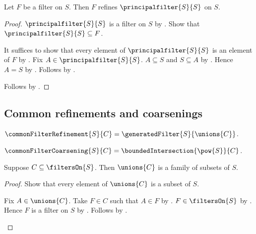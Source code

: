\begin{proposition}\label{every_filter_refines_carrier_principal_filter}
    Let $F$ be a filter on $S$.
    Then $F$ refines $\principalfilter{S}{S}$ on $S$.
\end{proposition}
\begin{proof}
    $\principalfilter{S}{S}$ is a filter on $S$ by
        .
    Show that $\principalfilter{S}{S}\subseteq F$.
    \begin{subproof}
        It suffices to show that every element of
            $\principalfilter{S}{S}$ is an element of $F$ by
            .
        Fix $A\in\principalfilter{S}{S}$.
        $A\subseteq S$ and $S\subseteq A$ by
            .
        Hence $A=S$ by .
        Follows by .
    \end{subproof}
    Follows by .
\end{proof}

\subsection{Common refinements and coarsenings}

\begin{definition}\label{common_filter_refinement}
    $\commonFilterRefinement{S}{C}
        =\generatedFilter{S}{\unions{C}}$.
\end{definition}

\begin{definition}\label{common_filter_coarsening}
    $\commonFilterCoarsening{S}{C}
        =\boundedIntersection{\pow{S}}{C}$.
\end{definition}

\begin{proposition}\label{union_of_filters_is_family}
    Suppose $C\subseteq\filtersOn{S}$.
    Then $\unions{C}$ is a family of subsets of $S$.
\end{proposition}
\begin{proof}
    Show that every element of $\unions{C}$ is a subset of $S$.
    \begin{subproof}
        Fix $A\in\unions{C}$.
        Take $F\in C$ such that $A\in F$ by .
        $F\in\filtersOn{S}$ by .
        Hence $F$ is a filter on $S$ by
            .
        Follows by .
    \end{subproof}
\end{proof}

